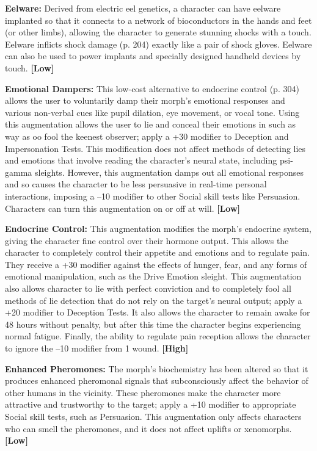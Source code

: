 \textbf{Eelware:} Derived from electric eel genetics, a character
can have eelware implanted so that it connects
to a network of bioconductors in the hands and feet 
(or other limbs), allowing the character to generate 
stunning shocks with a touch. Eelware inflicts shock 
damage (p. 204) exactly like a pair of shock gloves. 
Eelware can also be used to power implants and specially
designed handheld devices by touch. \textbf{[Low]}

\textbf{Emotional Dampers: }This low-cost alternative to 
endocrine control (p. 304) allows the user to voluntarily
damp their morph's emotional responses
and various non-verbal cues like pupil dilation, eye 
movement, or vocal tone. Using this augmentation 
allows the user to lie and conceal their emotions in 
such as way as oo fool the keenest observer; apply a 
+30 modifier to Deception and Impersonation Tests. 
This modification does not affect methods of detecting 
lies and emotions that involve reading the character's 
neural state, including psi-gamma sleights. However, 
this augmentation damps out all emotional responses 
and so causes the character to be less persuasive in real-time
personal interactions, imposing a –10 modifier
to other Social skill tests like Persuasion. Characters 
can turn this augmentation on or off at will. \textbf{[Low]}

\textbf{Endocrine Control:} This augmentation modifies the 
morph's endocrine system, giving the character fine 
control over their hormone output. This allows the 
character to completely control their appetite and 
emotions and to regulate pain. They receive a +30 
modifier against the effects of hunger, fear, and any 
forms of emotional manipulation, such as the Drive 
Emotion sleight. This augmentation also allows character
to lie with perfect conviction and to completely
fool all methods of lie detection that do not rely 
on the target's neural output; apply a +20 modifier 
to Deception Tests. It also allows the character to 
remain awake for 48 hours without penalty, but after 
this time the character begins experiencing normal 
fatigue. Finally, the ability to regulate pain reception 
allows the character to ignore the –10 modifier from 
1 wound. \textbf{[High]}

\textbf{Enhanced Pheromones:} The morph's biochemistry 
has been altered so that it produces enhanced pheromonal
signals that subconsciously affect the behavior
of other humans in the vicinity. These pheromones 
make the character more attractive and trustworthy to 
the target; apply a +10 modifier to appropriate Social 
skill tests, such as Persuasion. This augmentation only 
affects characters who can smell the pheromones, and 
it does not affect uplifts or xenomorphs. \textbf{[Low]}

